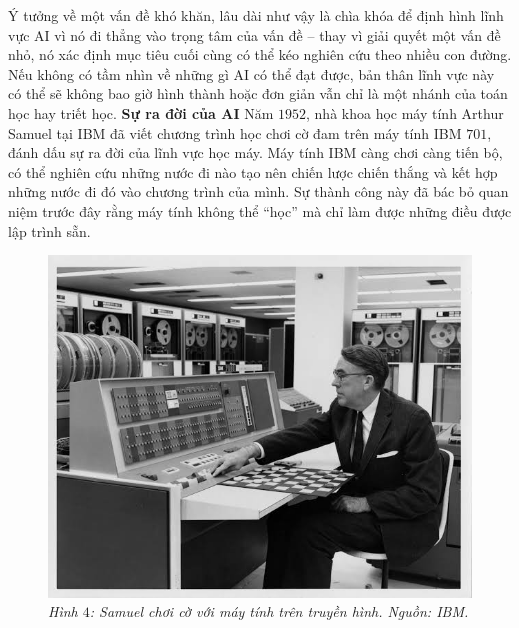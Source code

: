 \begin{multicols}{2}
	\vskip 0.1cm
	Ý tưởng về một vấn đề khó khăn, lâu dài như vậy là chìa khóa để định hình lĩnh vực AI vì nó đi thẳng vào trọng tâm của vấn đề -- thay vì giải quyết một vấn đề nhỏ, nó xác định mục tiêu cuối cùng có thể kéo nghiên cứu theo nhiều con đường. Nếu không có tầm nhìn về những gì AI có thể đạt được, bản thân lĩnh vực này có thể sẽ không bao giờ hình thành hoặc đơn giản vẫn chỉ là một nhánh của toán học hay triết học. 
	\vskip 0.1cm
	\textbf{\color{cackithi}Sự ra đời của AI}
	\vskip 0.1cm
	Năm $1952$, nhà khoa học máy tính Arthur Samuel tại IBM đã viết chương trình học chơi cờ đam trên máy tính IBM $701$, đánh dấu sự ra đời của lĩnh vực học máy. Máy tính IBM càng chơi càng tiến bộ, có thể nghiên cứu những nước đi nào tạo nên chiến lược chiến thắng và kết hợp những nước đi đó vào chương trình của mình. Sự thành công này đã bác bỏ quan niệm trước đây rằng máy tính không thể “học” mà chỉ làm được những điều được lập trình sẵn.
	\begin{figure}[H]
		\vspace*{-5pt}
		\centering
		\captionsetup{labelformat= empty, justification=centering}
		\includegraphics[width= 1\linewidth]{Samuel_Checker.jpeg}
		\caption{\small\textit{\color{cackithi}Hình $4$: Samuel chơi cờ với máy tính trên truyền hình. Nguồn: IBM.}}
		\vspace*{-10pt}
	\end{figure}

\end{multicols}
